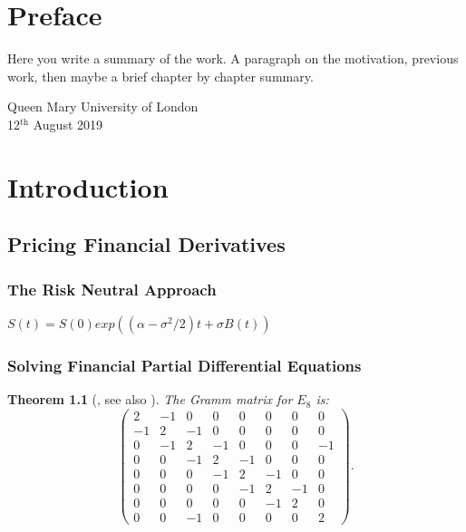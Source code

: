 \documentclass[12pt, oneside]{book}
\theoremstyle{plain}
\newtheorem{theorem}{Theorem}[section]
\theoremstyle{definition}
\begin{document}
\chapter*{Preface}
Here  you write a summary of the work. A paragraph on the motivation, previous work, then maybe a brief chapter by chapter summary. 

\lipsum[100]%



\begin{flushright}
Queen Mary University of London\\
12${}^{\text{th}}$ August 2019
\end{flushright}


\tableofcontents

\chapter{Introduction}

\section{Pricing Financial Derivatives}\label{Pricing Financial Derivatives}
\subsection{The Risk Neutral Approach}

$ S(t) = S(0) exp((\alpha - \sigma^2/2)t + \sigma B(t)) $
\subsection{Solving Financial Partial Differential Equations}

\begin{theorem}[{\cite[Theorem 2.3]{Petri}, see also \cite[pg. 45]{BlackScholes}}]\label{PetriTheorem}
The Gramm matrix for $E_8$ is:
$$
\begin{pmatrix}
2	&-1&0	&0	&0	&0	&0	&0\\
-1	&2	&-1	&0	&0	&0	&0	&0\\
0	&-1	&2	&-1	&0	&0	&0	&-1\\
0	&0	&-1	&2	&-1	&0	&0	&0\\
0	&0	&0	&-1	&2	&-1	&0	&0\\
0	&0	&0	&0	&-1	&2	&-1	&0\\
0	&0	&0	&0	&0	&-1	&2	&0\\
0	&0	&-1	&0	&0	&0	&0	&2
\end{pmatrix}.
$$
\end{theorem}
\end{document}
